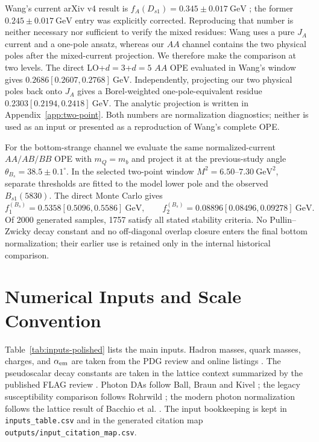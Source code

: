\documentclass[11pt]{article}
\newcommand{\Bsone}{B_{s1}}
\newcommand{\GeV}{\mathrm{GeV}}
\begin{document}
Wang's current arXiv v4 result is
$f_A(D_{s1})=0.345\pm0.017~\GeV$ \cite{Wang2015}; the former
$0.245\pm0.017~\GeV$ entry was explicitly corrected.  Reproducing that number
is neither necessary nor sufficient to verify the mixed residues: Wang uses a
pure $J_A$ current and a one-pole ansatz, whereas our $AA$ channel contains the
two physical poles after the mixed-current projection.  We therefore make the
comparison at two levels.  The direct LO+$d=3$+$d=5$ $AA$ OPE evaluated in
Wang's window gives $0.2686[0.2607,0.2768]~\GeV$.  Independently, projecting
our two physical poles back onto $J_A$ gives a Borel-weighted one-pole-equivalent
residue $0.2303[0.2194,0.2418]~\GeV$.  The analytic projection is written in
Appendix~\ref{app:two-point}.  Both numbers are normalization diagnostics;
neither is used as an input or presented as a reproduction of Wang's complete
OPE.

For the bottom-strange channel we evaluate the same normalized-current
$AA/AB/BB$ OPE with $m_Q=m_b$ and project it at the previous-study angle
$\theta_{B_s}=38.5\pm0.1^\circ$.  In the selected two-point window
$M^2=6.50$--$7.30~\GeV^2$, separate thresholds are fitted to the model lower
pole and the observed $\Bsone(5830)$.  The direct Monte Carlo gives
\begin{equation}
 f_1^{(B_s)}=0.5358[0.5096,0.5586]~\GeV,\qquad
 f_2^{(B_s)}=0.08896[0.08496,0.09278]~\GeV .
\end{equation}
Of 2000 generated samples, 1757 satisfy all stated stability criteria.
No Pullin--Zwicky decay constant and no
off-diagonal overlap closure enters the final bottom normalization; their
earlier use is retained only in the internal historical comparison.

\section{Numerical Inputs and Scale Convention}

Table~\ref{tab:inputs-polished} lists the main inputs.  Hadron masses, quark
masses, charges, and $\alpha_{\rm em}$ are taken from the PDG review and
online listings \cite{PDG2024,PDG2026}.  The pseudoscalar decay constants are
taken in the lattice context summarized by the published FLAG review
\cite{FLAG2024}.  Photon DAs follow Ball, Braun and
Kivel \cite{Ball:2002ps}; the legacy susceptibility comparison follows
Rohrwild \cite{Rohrwild2007}; the modern photon normalization follows the
lattice result of Bacchio et al. \cite{Bacchio2024}.  The input bookkeeping is
kept in \texttt{inputs\_table.csv} and in the generated citation map
\texttt{outputs/input\_citation\_map.csv}.
\end{document}
